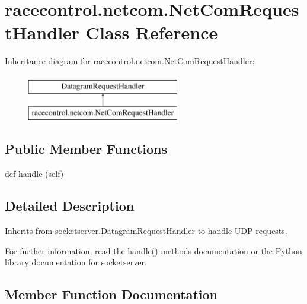 \hypertarget{classracecontrol_1_1netcom_1_1NetComRequestHandler}{}\section{racecontrol.\+netcom.\+Net\+Com\+Request\+Handler Class Reference}
\label{classracecontrol_1_1netcom_1_1NetComRequestHandler}
Inheritance diagram for racecontrol.\+netcom.\+Net\+Com\+Request\+Handler\+:\begin{figure}[H]
\begin{center}
\leavevmode
\includegraphics[height=2.000000cm]{classracecontrol_1_1netcom_1_1NetComRequestHandler}
\end{center}
\end{figure}
\subsection*{Public Member Functions}
\begin{DoxyCompactItemize}
\item 
def \hyperlink{classracecontrol_1_1netcom_1_1NetComRequestHandler_a78fc260655402d03147362ba756f885e}{handle} (self)
\end{DoxyCompactItemize}


\subsection{Detailed Description}
\begin{DoxyVerb}Inherits from socketserver.DatagramRequestHandler to handle UDP
requests.

For further information, read the handle() methods documentation or the
Python library documentation for socketserver.
\end{DoxyVerb}
 

\subsection{Member Function Documentation}
